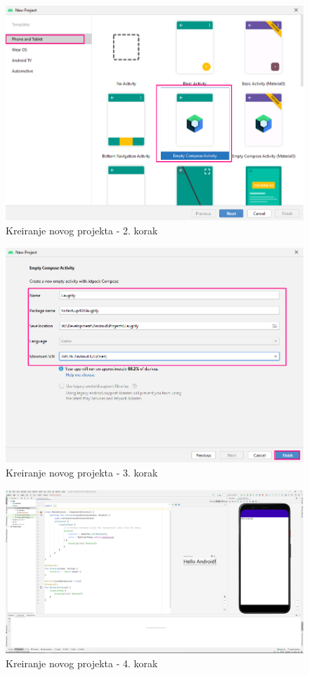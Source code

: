 \documentclass[11pt,a4paper,twoside]{article}
\begin{document}
\begin{figure}[!h]
	\centering
	\includegraphics[width=\textwidth]{new_project_02.png}
	\caption{Kreiranje novog projekta - 2. korak}
	\label{fig:new_project_02}	
\end{figure}

\begin{figure}[!h]
	\centering
	\includegraphics[width=\textwidth]{new_project_03.png}
	\caption{Kreiranje novog projekta - 3. korak}
	\label{fig:new_project_03}	
\end{figure}

\begin{figure}[!h]
	\centering
	\includegraphics[width=\textwidth]{new_project_04.png}
	\caption{Kreiranje novog projekta - 4. korak}
	\label{fig:new_project_04}	
\end{figure}
\end{document}
